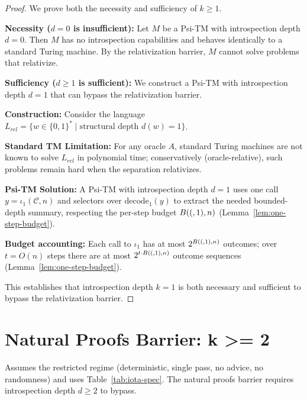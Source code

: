 \begin{proof}
We prove both the necessity and sufficiency of $k \geq 1$.

\textbf{Necessity ($d = 0$ is insufficient):}
Let $M$ be a Psi-TM with introspection depth $d = 0$. Then $M$ has no introspection capabilities and behaves identically to a standard Turing machine. By the relativization barrier, $M$ cannot solve problems that relativize.

\textbf{Sufficiency ($d \ge 1$ is sufficient):}
We construct a Psi-TM with introspection depth $d = 1$ that can bypass the relativization barrier.

\textbf{Construction:}
Consider the language $L_{rel} = \{w \in \{0,1\}^* \mid \text{structural depth } d(w) = 1\}$.

\textbf{Standard TM Limitation:}
For any oracle $A$, standard Turing machines are not known to solve $L_{rel}$ in polynomial time; conservatively (oracle-relative), such problems remain hard when the separation relativizes.

\textbf{Psi-TM Solution:}
A Psi-TM with introspection depth $d = 1$ uses one call $y=\iota_1(\mathcal{C},n)$ and selectors over $\mathrm{decode}_1(y)$ to extract the needed bounded-depth summary, respecting the per-step budget $B((,1),n)$ (Lemma~\ref{lem:one-step-budget}).

\textbf{Budget accounting:}
Each call to $\iota_1$ has at most $2^{B((,1),n)}$ outcomes; over $t=O(n)$ steps there are at most $2^{t\cdot B((,1),n)}$ outcome sequences (Lemma~\ref{lem:one-step-budget}).

This establishes that introspection depth $k = 1$ is both necessary and sufficient to bypass the relativization barrier.
\end{proof}

\section{Natural Proofs Barrier: k >= 2}

\begin{theorem}
Assumes the restricted regime (deterministic, single pass, no advice, no randomness) and uses Table~\ref{tab:iota-spec}.
The natural proofs barrier requires introspection depth $d \geq 2$ to bypass.
\end{theorem}

